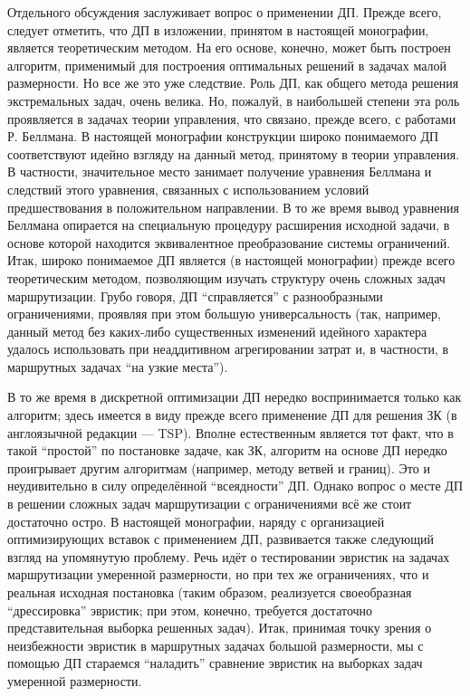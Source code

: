 \documentclass[12pt]{report}
\begin{document}
Отдельного обсуждения заслуживает вопрос о применении ДП.
Прежде всего, следует отметить, что ДП в изложении,
принятом в настоящей монографии,
является теоретическим методом.
На его основе, конечно, может быть построен алгоритм,
применимый для построения оптимальных решений
в задачах малой размерности. Но все же это уже следствие.
Роль ДП, как общего метода решения экстремальных задач,
очень велика.
Но, пожалуй, в наибольшей степени эта роль проявляется
в задачах теории управления, что связано, прежде всего,
с работами Р. Беллмана.
В настоящей монографии конструкции широко понимаемого ДП
соответствуют идейно взгляду на данный метод,
принятому в теории управления.
В частности, значительное место занимает
получение уравнения Беллмана и следствий этого уравнения,
связанных с использованием условий предшествования
в положительном направлении.
В то же время вывод уравнения Беллмана
опирается на специальную процедуру расширения исходной задачи,
в основе которой находится эквивалентное преобразование системы ограничений.
Итак, широко понимаемое ДП является (в настоящей монографии)
прежде всего теоретическим методом,
позволяющим изучать структуру очень сложных задач маршрутизации.
Грубо говоря, ДП ``справляется'' с разнообразными ограничениями,
проявляя при этом большую универсальность
(так, например, данный метод без каких-либо
существенных изменений идейного характера
удалось использовать при неаддитивном агрегировании затрат и,
в частности, в маршрутных задачах  “на узкие места”).

В то же время в дискретной оптимизации ДП
нередко воспринимается только как алгоритм;
здесь имеется в виду прежде всего применение
ДП для решения ЗК
(в англоязычной редакции — TSP).
Вполне естественным является тот факт,
что в такой “простой” по постановке задаче,
как ЗК, алгоритм на основе ДП нередко проигрывает
другим алгоритмам
(например, методу ветвей и границ).
Это и неудивительно в силу определённой “всеядности” ДП.
Однако вопрос о месте ДП в решении
сложных задач маршрутизации с ограничениями
всё же стоит достаточно остро.
В настоящей монографии, наряду с организацией оптимизирующих вставок
с применением ДП,
развивается также следующий взгляд
на упомянутую проблему.
Речь идёт о тестировании эвристик на
задачах маршрутизации умеренной размерности,
но при тех же ограничениях,
что и реальная исходная постановка
(таким образом, реализуется своеобразная
“дрессировка” эвристик; при этом,
конечно, требуется достаточно представительная выборка решенных задач).
Итак, принимая точку зрения о неизбежности эвристик
в маршрутных задачах большой размерности,
мы с помощью ДП стараемся “наладить”
сравнение эвристик на выборках задач умеренной размерности.
\end{document}
